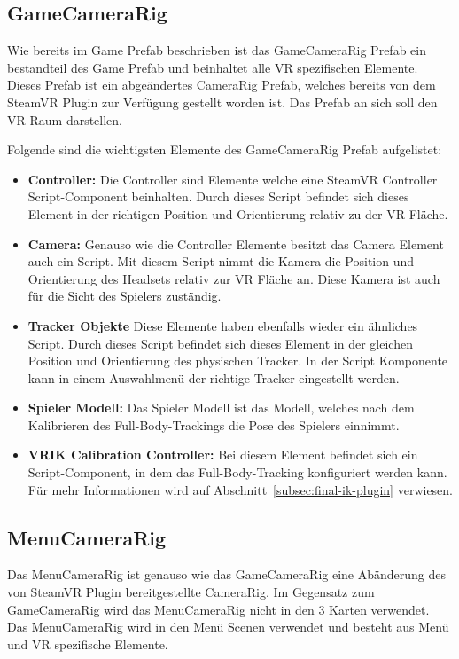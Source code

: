 \subsection{GameCameraRig}\label{subsec:game-camera-rig}

Wie bereits im Game Prefab beschrieben ist das GameCameraRig Prefab ein bestandteil des Game Prefab und beinhaltet alle VR spezifischen Elemente.
Dieses Prefab ist ein abgeändertes CameraRig Prefab, welches bereits von dem SteamVR Plugin zur Verfügung gestellt worden ist.
Das Prefab an sich soll den VR Raum darstellen.

Folgende sind die wichtigsten Elemente des GameCameraRig Prefab aufgelistet:

\begin{itemize}
    \item \textbf{Controller:} Die Controller sind Elemente welche eine SteamVR Controller Script-Component beinhalten.
    Durch dieses Script befindet sich dieses Element in der richtigen Position und Orientierung relativ zu der VR Fläche.
    \item \textbf{Camera:} Genauso wie die Controller Elemente besitzt das Camera Element auch ein Script.
    Mit diesem Script nimmt die Kamera die Position und Orientierung des Headsets relativ zur VR Fläche an.
    Diese Kamera ist auch für die Sicht des Spielers zuständig.
    \item \textbf{Tracker Objekte} Diese Elemente haben ebenfalls wieder ein ähnliches Script.
    Durch dieses Script befindet sich dieses Element in der gleichen Position und Orientierung des physischen Tracker.
    In der Script Komponente kann in einem Auswahlmenü der richtige Tracker eingestellt werden.
    \item \textbf{Spieler Modell:} Das Spieler Modell ist das Modell, welches nach dem Kalibrieren des Full-Body-Trackings die Pose des Spielers einnimmt.
    \item \textbf{VRIK Calibration Controller:} Bei diesem Element befindet sich ein Script-Component, in dem das Full-Body-Tracking konfiguriert werden kann.
    Für mehr Informationen wird auf Abschnitt~\ref{subsec:final-ik-plugin} verwiesen.
\end{itemize}

\subsection{MenuCameraRig}\label{subsec:menu-camera-rig}

Das MenuCameraRig ist genauso wie das GameCameraRig eine Abänderung des von SteamVR Plugin bereitgestellte CameraRig.
Im Gegensatz zum GameCameraRig wird das MenuCameraRig nicht in den 3 Karten verwendet.
Das MenuCameraRig wird in den Menü Scenen verwendet und besteht aus Menü und VR spezifische Elemente.

